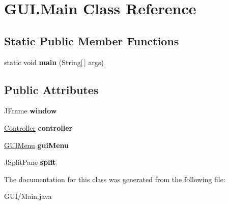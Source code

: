 \hypertarget{class_g_u_i_1_1_main}{}\section{G\+U\+I.\+Main Class Reference}
\label{class_g_u_i_1_1_main}
\subsection*{Static Public Member Functions}
\begin{DoxyCompactItemize}
\item 
\mbox{\label{class_g_u_i_1_1_main_a57906af5ce96d43ee938b377e6b6cff1}} 
static void {\bfseries main} (String\mbox{[}$\,$\mbox{]} args)
\end{DoxyCompactItemize}
\subsection*{Public Attributes}
\begin{DoxyCompactItemize}
\item 
\mbox{\label{class_g_u_i_1_1_main_a317b54ae558fd9bccc1d1d7cafb2fd55}} 
J\+Frame {\bfseries window}
\item 
\mbox{\label{class_g_u_i_1_1_main_ac87c768f2874f53b544f7ae8add61d85}} 
\mbox{\hyperlink{classcontroller_1_1_controller}{Controller}} {\bfseries controller}
\item 
\mbox{\label{class_g_u_i_1_1_main_ad5e6fdd408007530240feceb89a68808}} 
\mbox{\hyperlink{class_g_u_i_1_1_g_u_i_menu}{G\+U\+I\+Menu}} {\bfseries gui\+Menu}
\item 
\mbox{\label{class_g_u_i_1_1_main_a21878e002bc0a9971c4118ad9c9fcf52}} 
J\+Split\+Pane {\bfseries split}
\end{DoxyCompactItemize}


The documentation for this class was generated from the following file\+:\begin{DoxyCompactItemize}
\item 
G\+U\+I/Main.\+java\end{DoxyCompactItemize}
